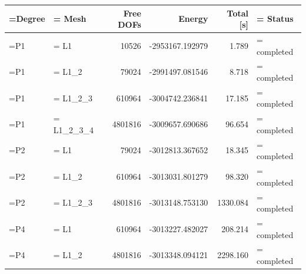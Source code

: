 \begin{tabularx}{\textwidth}{@{}>{\hsize=0.72\hsize\linewidth=\hsize\RaggedRight\arraybackslash}X>{\hsize=0.72\hsize\linewidth=\hsize\RaggedRight\arraybackslash}Xr r r >{\hsize=0.74\hsize\linewidth=\hsize\RaggedRight\arraybackslash}X@{}}
\toprule
Degree & Mesh & Free DOFs & Energy & Total [s] & Status \\
\midrule
P1 & L1 & 10526 & -2953167.192979 & 1.789 & completed \\
P1 & L1\_2 & 79024 & -2991497.081546 & 8.718 & completed \\
P1 & L1\_2\_3 & 610964 & -3004742.236841 & 17.185 & completed \\
P1 & L1\_2\_3\_4 & 4801816 & -3009657.690686 & 96.654 & completed \\
P2 & L1 & 79024 & -3012813.367652 & 18.345 & completed \\
P2 & L1\_2 & 610964 & -3013031.801279 & 98.320 & completed \\
P2 & L1\_2\_3 & 4801816 & -3013148.753130 & 1330.084 & completed \\
P4 & L1 & 610964 & -3013227.482027 & 208.214 & completed \\
P4 & L1\_2 & 4801816 & -3013348.094121 & 2298.160 & completed \\
\bottomrule
\end{tabularx}
